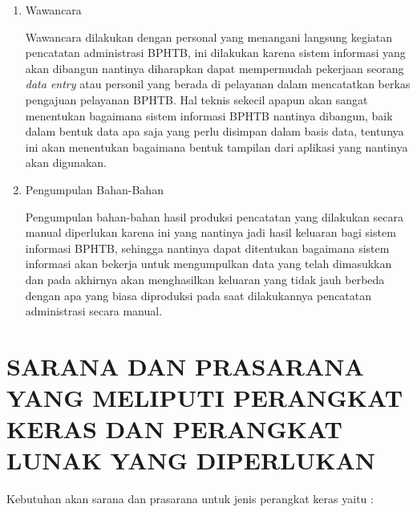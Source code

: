 \documentclass[pdftex,12pt, oneside]{article}
\begin{document}
\begin{enumerate}[1.]
\item Wawancara

Wawancara dilakukan dengan personal yang menangani langsung kegiatan pencatatan administrasi BPHTB, ini dilakukan karena sistem informasi yang akan dibangun nantinya diharapkan dapat mempermudah pekerjaan seorang \textit{data entry} atau personil yang berada di pelayanan dalam mencatatkan berkas pengajuan pelayanan BPHTB. Hal teknis sekecil apapun akan sangat menentukan bagaimana sistem informasi BPHTB nantinya dibangun, baik dalam bentuk data apa saja yang perlu disimpan dalam basis data, tentunya ini akan menentukan bagaimana bentuk tampilan dari aplikasi yang nantinya akan digunakan.

\item Pengumpulan Bahan-Bahan

Pengumpulan bahan-bahan hasil produksi pencatatan yang dilakukan secara manual diperlukan karena ini yang nantinya jadi hasil keluaran bagi sistem informasi BPHTB, sehingga nantinya dapat ditentukan bagaimana sistem informasi akan bekerja untuk mengumpulkan data yang telah dimasukkan dan pada akhirnya akan menghasilkan keluaran yang tidak jauh berbeda dengan apa yang biasa diproduksi pada saat dilakukannya pencatatan administrasi secara manual.
\end{enumerate}

\section{SARANA DAN PRASARANA YANG MELIPUTI PERANGKAT KERAS DAN PERANGKAT LUNAK YANG DIPERLUKAN}

Kebutuhan akan sarana dan prasarana untuk jenis perangkat keras yaitu :
\end{document}
